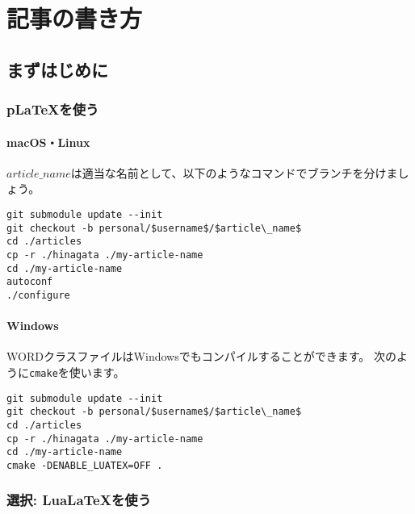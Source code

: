\usepackage{listings}
\lstset{
  basicstyle=\ttfamily,
  commentstyle=\textit,
  frame=trBL,
  numbers=left,
  breaklines=true,
  title=\lstname,
}
\usepackage{fancybox}
\usepackage{url}

\subtitle{ヘッダの見出し}
\author{ほげ}



\chapter{記事の書き方}

\section{まずはじめに}

\subsection{p\LaTeX を使う}

\subsubsection{macOS・Linux}

$article\_name$は適当な名前として、以下のようなコマンドでブランチを分けましょう。

\begin{lstlisting}[mathescape]
git submodule update --init
git checkout -b personal/$username$/$article\_name$
cd ./articles
cp -r ./hinagata ./my-article-name
cd ./my-article-name
autoconf
./configure
\end{lstlisting}

\subsubsection{Windows}

WORDクラスファイルはWindowsでもコンパイルすることができます。
次のように\lstinline|cmake|を使います。

\begin{lstlisting}[mathescape]
git submodule update --init
git checkout -b personal/$username$/$article\_name$
cd ./articles
cp -r ./hinagata ./my-article-name
cd ./my-article-name
cmake -DENABLE_LUATEX=OFF .
\end{lstlisting}

\subsection{選択: Lua\LaTeX を使う}

